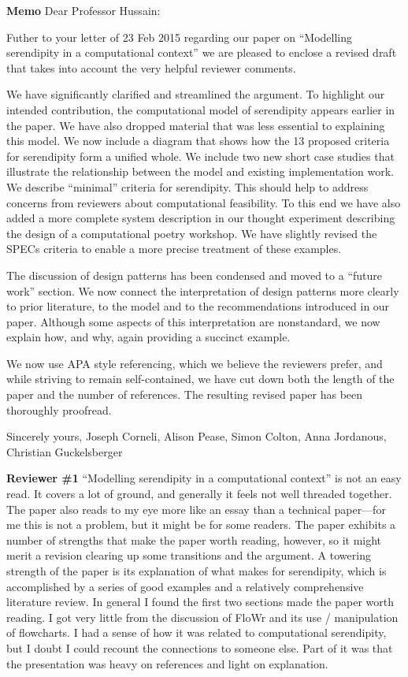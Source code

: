 \textbf{Memo}
Dear Professor Hussain:

Futher to your letter of 23 Feb 2015 regarding our paper on “Modelling serendipity in a
computational context” we are pleased to enclose a revised draft that takes into account the
very helpful reviewer comments.

We have significantly clarified and streamlined the argument. To highlight our intended
contribution, the computational model of serendipity appears earlier in the paper. We have also
dropped material that was less essential to explaining this model. We now include a diagram
that shows how the 13 proposed criteria for serendipity form a unified whole.
We include two new short case studies that illustrate the relationship between the model and
existing implementation work. We describe “minimal” criteria for serendipity. This should help
to address concerns from reviewers about computational feasibility. To this end we have also
added a more complete system description in our thought experiment describing the design of a
computational poetry workshop. We have slightly revised the SPECs criteria to enable a more
precise treatment of these examples.

The discussion of design patterns has been condensed and moved to a “future work” section.
We now connect the interpretation of design patterns more clearly to prior literature, to the
model and to the recommendations introduced in our paper. Although some aspects of this
interpretation are nonstandard, we now explain how, and why, again providing a succinct
example.

We now use APA style referencing, which we believe the reviewers prefer, and while striving to
remain self-contained, we have cut down both the length of the paper and the number of
references. The resulting revised paper has been thoroughly proofread.

Sincerely yours,
Joseph Corneli, Alison Pease, Simon Colton, Anna Jordanous, Christian Guckelsberger

\textbf{Reviewer \#1}
“Modelling serendipity in a computational context” is not an easy read. It covers a lot of ground,
and generally it feels not well threaded together. The paper also reads to my eye more like an
essay than a technical paper—for me this is not a problem, but it might be for some readers.
The paper exhibits a number of strengths that make the paper worth reading, however, so it
might merit a revision clearing up some transitions and the argument.
A towering strength of the paper is its explanation of what makes for serendipity, which is
accomplished by a series of good examples and a relatively comprehensive literature review. In
general I found the first two sections made the paper worth reading.
I got very little from the discussion of FloWr and its use / manipulation of flowcharts. I had a
sense of how it was related to computational serendipity, but I doubt I could recount the
connections to someone else. Part of it was that the presentation was heavy on references and
light on explanation.

